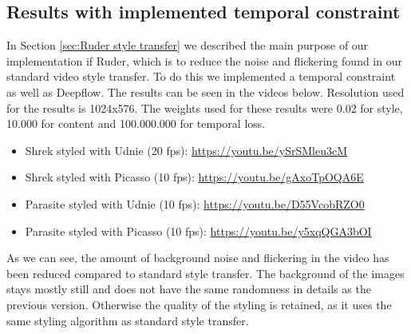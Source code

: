 \subsection{Results with implemented temporal constraint}
\label{seq:ruder_result}
In Section \ref{sec:Ruder style transfer} we described the main purpose of our implementation if Ruder, which is to reduce the noise and flickering found in our standard video style transfer. To do this we implemented a temporal constraint as well as Deepflow. The results can be seen in the videos below.\newline
Resolution used for the results is 1024x576.\newline
The weights used for these results were 0.02 for style, 10.000 for content and 100.000.000 for temporal loss. 
\begin{itemize}
\item{Shrek styled with Udnie (20 fps): \url{https://youtu.be/ySrSMleu3cM}}
\item{Shrek styled with Picasso (10 fps): \url{https://youtu.be/gAxoTpOQA6E}}
\item{Parasite styled with Udnie (10 fps): \url{https://youtu.be/D55VcobRZO0}}
\item{Parasite styled with Picasso (10 fps): \url{https://youtu.be/y5xqQGA3bOI}}
\end{itemize}
As we can see, the amount of background noise and flickering in the video has been reduced compared to standard style transfer. The background of the images stays mostly still and does not have the same randomness in details as the previous version. Otherwise the quality of the styling is retained, as it uses the same styling algorithm as standard style transfer.